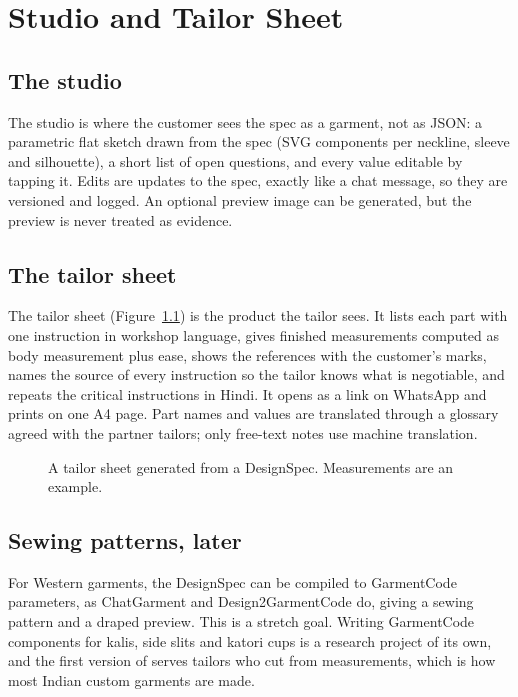 \chapter{Studio and Tailor Sheet}\label{ch:sheet}

\section{The studio}

The studio is where the customer sees the spec as a garment, not as JSON: a parametric flat sketch drawn from the spec (SVG components per neckline, sleeve and silhouette), a short list of open questions, and every value editable by tapping it. Edits are updates to the spec, exactly like a chat message, so they are versioned and logged. An optional preview image can be generated, but the preview is never treated as evidence.

\section{The tailor sheet}

The tailor sheet (Figure~\ref{fig:sheet}) is the product the tailor sees. It lists each part with one instruction in workshop language, gives finished measurements computed as body measurement plus ease, shows the references with the customer's marks, names the source of every instruction so the tailor knows what is negotiable, and repeats the critical instructions in Hindi. It opens as a link on WhatsApp and prints on one A4 page. Part names and values are translated through a glossary agreed with the partner tailors; only free-text notes use machine translation.

\begin{figure}[h]
\centering
\caption{A tailor sheet generated from a DesignSpec. Measurements are an example.}\label{fig:sheet}
\end{figure}

\section{Sewing patterns, later}

For Western garments, the DesignSpec can be compiled to GarmentCode parameters, as ChatGarment and Design2GarmentCode do, giving a sewing pattern and a draped preview. This is a stretch goal. Writing GarmentCode components for kalis, side slits and katori cups is a research project of its own, and the first version of \sys{} serves tailors who cut from measurements, which is how most Indian custom garments are made.
